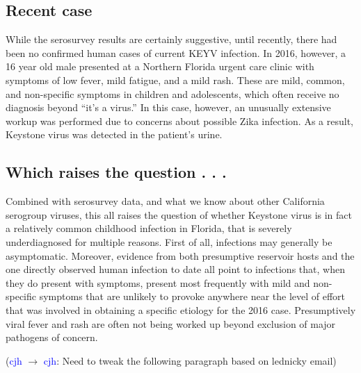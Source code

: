 \documentclass[12pt]{article}
\newcommand{\cjh}{\textcolor{blue}{cjh}}
\newcommand{\msg}[3]{(#1 $\rightarrow$ #2: #3)}
\newcommand{\mcc}[1]{\msg\cjh\cjh{#1}}
\begin{document}

        \subsection{Recent case}
            \label{recent-case}
            While the serosurvey results are certainly suggestive, until recently, there had been no confirmed human cases of current KEYV infection. In 2016, however, a 16 year old male presented at a Northern Florida urgent care clinic with symptoms of low fever, mild fatigue, and a mild rash. These are mild, common, and non-specific symptoms in children and adolescents, which often receive no diagnosis beyond ``it's a virus.'' In this case, however, an unusually extensive workup was performed due to concerns about possible Zika infection. As a result, Keystone virus was detected in the patient's urine.\cite{lednicky2018keystone}
        

        \subsection{Which raises the question . . .}
            \label{raises-the-question}
            Combined with serosurvey data, and what we know about other California serogroup viruses, this all raises the question of whether Keystone virus is in fact a relatively common childhood infection in Florida, that is severely underdiagnosed for multiple reasons. First of all, infections may generally be asymptomatic. Moreover, evidence from both presumptive reservoir hosts and the one directly observed human infection to date all point to infections that, when they do present with symptoms, present most frequently with mild and non-specific symptoms that are unlikely to provoke anywhere near the level of effort that was involved in obtaining a specific etiology for the 2016 case. Presumptively viral fever and rash are often not being worked up beyond exclusion of major pathogens of concern.
        
            \mcc{Need to tweak the following paragraph based on lednicky email}
\end{document}
